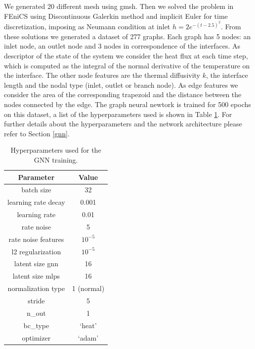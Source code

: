 \documentclass[11pt,a4paper]{article}
\begin{document}
We generated 20 different mesh using gmsh. 
Then we solved the problem in FEniCS using Discontinuous Galerkin method and implicit Euler for time discretization, imposing as Neumann condition at inlet \(h = 2e^{-(t-2.5)^2}\).
From these solutions we generated a dataset of 277 graphs. 
Each graph has 5 nodes: an inlet node, an outlet node and 3 nodes in correspondence of the interfaces. 
As descriptor of the state of the system we consider the heat flux at each time step, which is computed as the integral of the normal derivative of the temperature on the interface. The other node features are the thermal diffusivity \(k\), the interface length and the nodal type (inlet, outlet or branch node). 
As edge features we consider the area of the corresponding trapezoid and the distance between the nodes connected by the edge. 
The graph neural newtork is trained for 500 epochs on this dataset, a list of the hyperparameters used is shown in Table \ref{hyperparams}. For further details about the hyperparameters and the network architecture please refer to Section \ref{gnn}.

\begin{table}[H]
    \centering
    \begin{tabular}{|c|c|}
        \hline
        \textbf{Parameter} & \textbf{Value} \\
        \hline
        batch size & 32 \\
        learning rate decay & 0.001 \\
        learning rate & 0.01 \\
        rate noise & 5 \\
        rate noise features & \(10^{-5}\) \\
        l2 regularization & \(10^{-5}\) \\
        latent size gnn & 16 \\
        latent size mlps & 16\\
        normalization type & 1 (normal) \\
        stride & 5 \\
        n\_out & 1 \\
        bc\_type &  `heat' \\
        optimizer & `adam' \\
        \hline   
    \end{tabular}
    \caption{Hyperparameters used for the GNN training.}
    \label{hyperparams}
\end{table}

\end{document}
